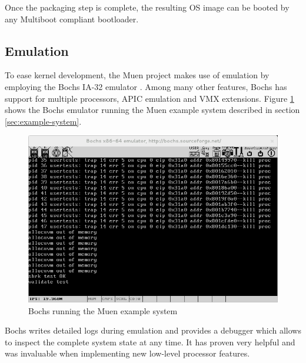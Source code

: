 Once the packaging step is complete, the resulting OS image can be booted by any
Multiboot \cite{multiboot} compliant bootloader.

\subsection{Emulation}\label{subsec:emulation}
To ease kernel development, the Muen project makes use of emulation by
employing the Bochs IA-32 emulator \cite{bochs}. Among many
other features, Bochs has support for multiple processors, APIC emulation and
VMX extensions.  Figure \ref{fig:bochs} shows the Bochs emulator running the
Muen example system described in section \ref{sec:example-system}.

\begin{figure}[h]
	\centering
	\includegraphics[width=\textwidth]{images/bochs}
	\caption{Bochs running the Muen example system}
	\label{fig:bochs}
\end{figure}

Bochs writes detailed logs during emulation and provides a debugger which allows
to inspect the complete system state at any time. It has proven very helpful
and was invaluable when implementing new low-level processor features.
